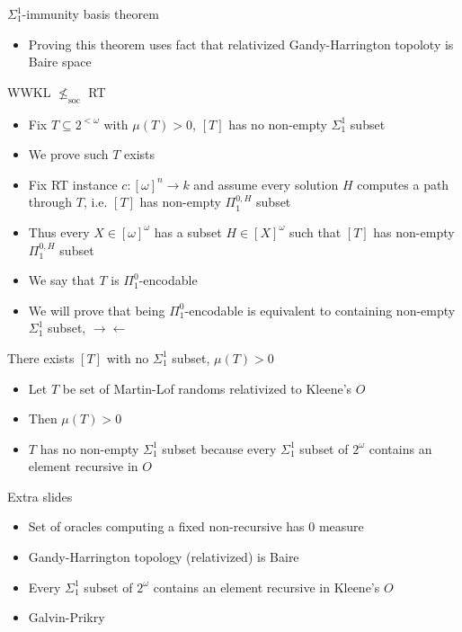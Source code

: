 \begin{frame}{$\Sigma_1^1$-immunity basis theorem}
  \begin{itemize}
    \item Proving this theorem uses fact that relativized Gandy-Harrington
      topoloty is Baire space
  \end{itemize}
\end{frame}

\begin{frame}{WWKL $\nleq_{\text{soc}}$ RT}
  \begin{itemize}
    \item Fix $T\subseteq 2^{<\omega}$ with $\mu(T)>0$, $[T]$
      has no non-empty $\Sigma_1^1$ subset
    \item We prove such $T$ exists
    \item Fix RT instance $c:[\omega]^n\rightarrow k$ and assume every
      solution $H$ computes a path through $T$, i.e. $[T]$ has non-empty
      $\Pi_1^{0,H}$ subset
    \item Thus every $X\in[\omega]^\omega$ has a subset
      $H\in[X]^\omega$ such that $[T]$ has non-empty $\Pi_1^{0,H}$ subset
    \item We say that $T$ is $\Pi_1^0$-encodable
    \item We will prove that being $\Pi_1^0$-encodable is equivalent to
      containing non-empty $\Sigma_1^1$ subset, $\rightarrow\leftarrow$
  \end{itemize}
\end{frame}

\begin{frame}{There exists $[T]$ with no $\Sigma_1^1$ subset, $\mu(T)>0$}
  \begin{itemize}
    \item Let $T$ be set of Martin-Lof randoms relativized to Kleene's $O$
    \item Then $\mu(T)>0$
    \item $T$ has no non-empty $\Sigma_1^1$ subset because every
      $\Sigma_1^1$ subset of $2^\omega$ contains an element recursive in
      $O$
  \end{itemize}
\end{frame}

\begin{frame}{Extra slides}
  \begin{itemize}
    \item Set of oracles computing a fixed non-recursive has 0 measure
    \item Gandy-Harrington topology (relativized) is Baire
    \item Every $\Sigma_1^1$ subset of $2^\omega$ contains an element
      recursive in Kleene's $O$
    \item Galvin-Prikry
  \end{itemize}
\end{frame}

